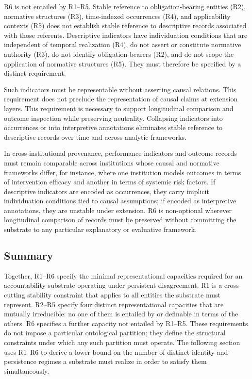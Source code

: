 R6 is not entailed by R1--R5.
Stable reference to obligation-bearing entities (R2),
normative structures (R3),
time-indexed occurrences (R4),
and applicability contexts (R5)
does not establish stable reference to descriptive records associated with those referents.
Descriptive indicators have individuation conditions that are
independent of temporal realization (R4),
do not assert or constitute normative authority (R3),
do not identify obligation-bearers (R2),
and do not scope the application of normative structures (R5).
They must therefore be specified by a distinct requirement.

Such indicators must be representable without asserting causal relations.
This requirement does not preclude the representation of causal claims
at extension layers.
This requirement is necessary to support longitudinal comparison and outcome
inspection while preserving neutrality.
Collapsing indicators into occurrences or into interpretive annotations
eliminates stable reference to descriptive records
over time and across analytic frameworks.

In cross-institutional provenance, performance indicators and outcome
records must remain comparable across
institutions whose causal and normative frameworks differ,
for instance, where one institution models outcomes
in terms of intervention efficacy and another in terms of systemic risk factors.
If descriptive indicators are encoded as occurrences, they carry implicit
individuation conditions tied to causal assumptions; if encoded as
interpretive annotations, they are unstable under extension.
R6 is non-optional wherever longitudinal comparison of records must be
preserved without committing the substrate to any particular explanatory
or evaluative framework.

\subsection{Summary}

Together, R1--R6 specify the minimal representational capacities required for
an accountability substrate operating under persistent disagreement.
R1 is a cross-cutting stability constraint that applies to all
entities the substrate must represent.
R2--R5 specify four distinct representational capacities
that are mutually irreducible:
no one of them is entailed by or definable in terms of the others.
R6 specifies a further capacity not entailed by R1--R5.
These requirements do not impose a particular ontological partition;
they define the structural constraints under which any such partition must operate.
The following section uses R1--R6 to derive a lower bound
on the number of distinct identity-and-persistence regimes a substrate
must realize in order to satisfy them simultaneously.
